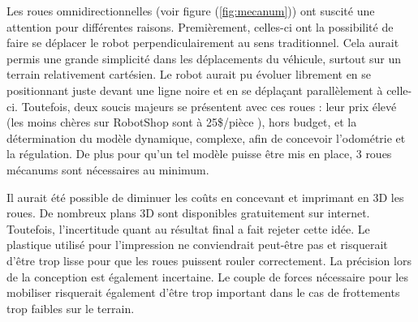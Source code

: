 \documentclass[a4paper,11pt]{article}
\begin{document}
Les roues omnidirectionnelles (voir figure (\ref{fig:mecanum})) ont suscité une attention pour différentes raisons. Premièrement, celles-ci ont la possibilité de faire se déplacer le robot perpendiculairement au sens traditionnel. Cela aurait permis une grande simplicité dans les déplacements du véhicule, surtout sur un terrain relativement cartésien. Le robot aurait pu évoluer librement en se positionnant juste devant une ligne noire et en se déplaçant parallèlement à celle-ci. Toutefois, deux soucis majeurs se présentent avec ces roues : leur prix élevé (les moins chères sur RobotShop sont à 25\$/pièce \cite{prixrouemeca}), hors budget, et la détermination du modèle dynamique, complexe, afin de concevoir l'odométrie et la régulation. De plus pour qu'un tel modèle puisse être mis en place, 3 roues mécanums sont nécessaires au minimum.

Il aurait été possible de diminuer les coûts en concevant et imprimant en 3D les roues. De nombreux plans 3D sont disponibles gratuitement sur internet. Toutefois, l'incertitude quant au résultat final a fait rejeter cette idée. Le plastique utilisé pour l'impression ne conviendrait peut-être pas et risquerait d'être trop lisse pour que les roues puissent rouler correctement. La précision lors de la conception est également incertaine. Le couple de forces nécessaire pour les mobiliser risquerait également d'être trop important dans le cas de frottements trop faibles sur le terrain.
\end{document}
